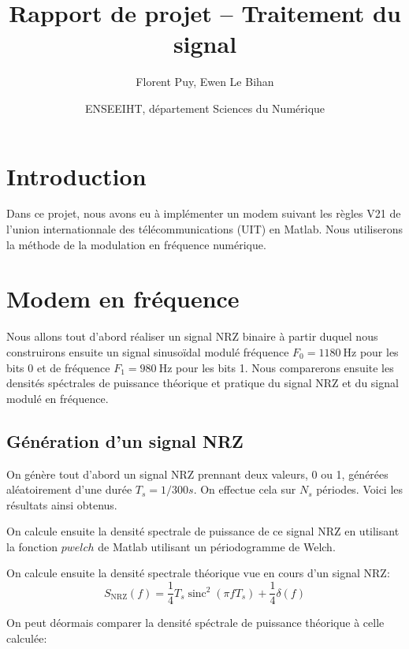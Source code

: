 \documentclass{article}
\title{Rapport de projet -- Traitement du signal}
\author{Florent Puy, Ewen Le Bihan}
\date{ENSEEIHT, département Sciences du Numérique}
\newcommand{\sinc}{\operatorname{sinc}}
\begin{document}
\maketitle



\tableofcontents

\section{Introduction}

Dans ce projet, nous avons eu à implémenter un modem suivant les règles V21 de l'union internationnale des télécommunications (UIT) en Matlab. Nous utiliserons la méthode de la modulation en fréquence numérique.

\section{Modem en fréquence}

Nous allons tout d'abord réaliser un signal NRZ binaire à partir duquel nous construirons ensuite un signal sinusoïdal modulé fréquence $F_0=\SI{1180}{\hertz}$ pour les bits 0 et de fréquence $F_1=\SI{980}{\hertz}$ pour les bits 1.
Nous comparerons ensuite les densités spéctrales de puissance théorique et pratique du signal NRZ et du signal modulé en fréquence.

\subsection{Génération d'un signal NRZ}

On génère tout d'abord un signal NRZ prennant deux valeurs, 0 ou 1, générées aléatoirement d'une durée $T_s=1/300 s$. On effectue cela sur $N_s$ périodes. Voici les résultats ainsi obtenus.


On calcule ensuite la densité spectrale de puissance de ce signal NRZ en utilisant la fonction $pwelch$ de Matlab utilisant un périodogramme de Welch.

On calcule ensuite la densité spectrale théorique vue en cours d'un signal NRZ:
\[
S_\text{NRZ}(f)=\frac{1}{4} T_s \sinc^2(\pi f T_s)+\frac{1}{4} \delta(f)
\]

On peut déormais comparer la densité spéctrale de puissance théorique à celle calculée:

\end{document}
